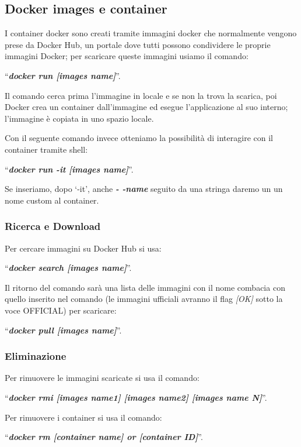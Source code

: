 \subsection{Docker images e container}\label{docker-images-e-container}

I container docker sono creati tramite immagini docker che normalmente
vengono prese da Docker Hub, un portale dove tutti possono condividere
le proprie immagini Docker; per scaricare queste immagini usiamo il
comando:

``\emph{\textbf{docker run {[}images name{]}}}''.

Il comando cerca prima l'immagine in locale e se non la trova la
scarica, poi Docker crea un container dall'immagine ed esegue
l'applicazione al suo interno; l'immagine è copiata in uno spazio
locale.

Con il seguente comando invece otteniamo la possibilità di interagire
con il container tramite shell:

``\emph{\textbf{docker run -it {[}images name{]}}}''.

Se inseriamo, dopo `-it', anche \emph{\textbf{- -name}} seguito da una
stringa daremo un un nome custom al container.

\subsubsection{Ricerca e Download}\label{ricerca-e-download}

Per cercare immagini su Docker Hub si usa:

``\emph{\textbf{docker search {[}images name{]}}}''.

Il ritorno del comando sarà una lista delle immagini con il nome
combacia con quello inserito nel comando (le immagini ufficiali avranno
il flag \emph{{[}OK{]}} sotto la voce OFFICIAL) per scaricare:

``\emph{\textbf{docker pull {[}images name{]}}}''.

\subsubsection{Eliminazione}\label{eliminazione}

Per rimuovere le immagini scaricate si usa il comando:

``\emph{\textbf{docker rmi {[}images name1{]} {[}images name2{]}
{[}images name N{]}}}''.

Per rimuovere i container si usa il comando:

``\emph{\textbf{docker rm {[}container name{]} or {[}container
ID{]}}}''.

